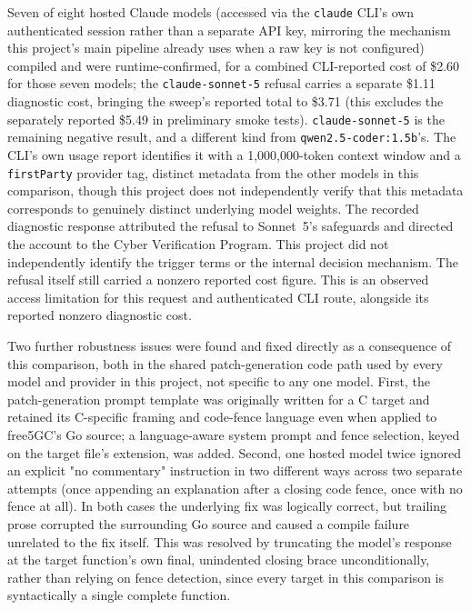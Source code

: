 \documentclass[12pt,a4paper]{report}
\begin{document}
Seven of eight hosted Claude models (accessed via the \texttt{claude} CLI's own authenticated session rather than a separate API key, mirroring the mechanism this project's main pipeline already uses when a raw key is not configured) compiled and were runtime-confirmed, for a combined CLI-reported cost of \$2.60 for those seven models; the \texttt{claude-sonnet-5} refusal carries a separate \$1.11 diagnostic cost, bringing the sweep's reported total to \$3.71 (this excludes the separately reported \$5.49 in preliminary smoke tests). \texttt{claude-sonnet-5} is the remaining negative result, and a different kind from \texttt{qwen2.5-coder:1.5b}'s. The CLI's own usage report identifies it with a 1{,}000{,}000-token context window and a \texttt{firstParty} provider tag, distinct metadata from the other models in this comparison, though this project does not independently verify that this metadata corresponds to genuinely distinct underlying model weights. The recorded diagnostic response attributed the refusal to Sonnet~5's safeguards and directed the account to the Cyber Verification Program. This project did not independently identify the trigger terms or the internal decision mechanism. The refusal itself still carried a nonzero reported cost figure. This is an observed access limitation for this request and authenticated CLI route, alongside its reported nonzero diagnostic cost.

Two further robustness issues were found and fixed directly as a consequence of this comparison, both in the shared patch-generation code path used by every model and provider in this project, not specific to any one model. First, the patch-generation prompt template was originally written for a C target and retained its C-specific framing and code-fence language even when applied to free5GC's Go source; a language-aware system prompt and fence selection, keyed on the target file's extension, was added. Second, one hosted model twice ignored an explicit "no commentary" instruction in two different ways across two separate attempts (once appending an explanation after a closing code fence, once with no fence at all). In both cases the underlying fix was logically correct, but trailing prose corrupted the surrounding Go source and caused a compile failure unrelated to the fix itself. This was resolved by truncating the model's response at the target function's own final, unindented closing brace unconditionally, rather than relying on fence detection, since every target in this comparison is syntactically a single complete function.
\end{document}
